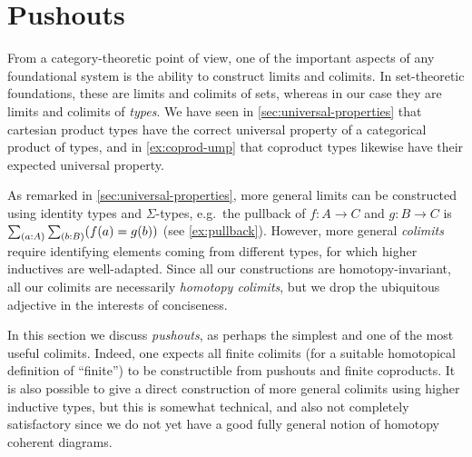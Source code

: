 %
%

%


\section{Pushouts}
\label{sec:colimits}

%
%
%
%
From a category-theoretic point of view, one of the important aspects of any foundational system is the ability to construct limits and colimits.
In set-theoretic foundations, these are limits and colimits of sets, whereas in our case they are limits and colimits of \emph{types}.
We have seen in \autoref{sec:universal-properties} that cartesian product types have the correct universal property of a categorical product of types, and in \autoref{ex:coprod-ump} that coproduct types likewise have their expected universal property.

As remarked in \autoref{sec:universal-properties}, more general limits can be constructed using identity types and $\Sigma$-types, e.g.\ the pullback of $f:A\to C$ and $g:B\to C$ is $\sm{a:A}{b:B} (f(a)=g(b))$ (see \autoref{ex:pullback}).
However, more general \emph{colimits} require identifying elements coming from different types, for which higher inductives are well-adapted.
Since all our constructions are homotopy-invariant, all our colimits are necessarily \emph{homotopy colimits}, but we drop the ubiquitous adjective in the interests of conciseness.

In this section we discuss \emph{pushouts}, as perhaps the simplest and one of the most useful colimits.
Indeed, one expects all finite colimits (for a suitable homotopical definition of ``finite'') to be constructible from pushouts and finite coproducts.
It is also possible to give a direct construction of more general colimits using higher inductive types, but this is somewhat technical, and also not completely satisfactory since we do not yet have a good fully general notion of homotopy coherent diagrams.

